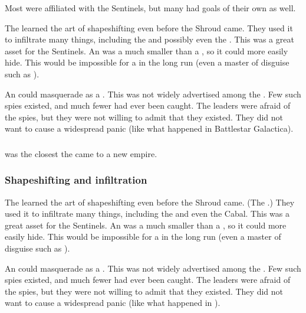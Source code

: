 Most \ophidians were affiliated with the Sentinels, but many had goals of their own as well.

The \ophidians learned the art of shapeshifting even before the Shroud came. 
They used it to infiltrate many things, including the \aryothim and possibly even the \resphain. 
This was a great asset for the Sentinels. 
An \ophidian was a much smaller \vertex than a \dragon, so it could more easily hide.
This would be impossible for a \dragon in the long run (even a master of disguise such as \Nzessuacrith). 

An \ophidian could masquerade as a \bezed. 
This was not widely advertised among the \resphain.
Few such spies existed, and much fewer had ever been caught. 
The \resphan leaders were afraid of the spies, but they were not willing to admit that they existed.
They did not want to cause a widespread panic (like what happened in Battlestar Galactica).





\subsubsection{\Saphyrae}
 was the closest the \ophidians came to a new empire. 





\subsubsection{Shapeshifting and infiltration}
The \ophidians learned the art of shapeshifting even before the Shroud came. 
(The \dragons {}.)
They used it to infiltrate many things, including the \aryothim and even the Cabal. 
This was a great asset for the Sentinels. 
An \ophidian was a much smaller \vertex than a \dragon, so it could more easily hide.
This would be impossible for a \dragon in the long run (even a master of disguise such as \Nzessuacrith). 

An \ophidian could masquerade as a \bezed. 
This was not widely advertised among the \resphain.
Few such spies existed, and much fewer had ever been caught. 
The \resphan leaders were afraid of the spies, but they were not willing to admit that they existed.
They did not want to cause a widespread panic (like what happened in \cite{TV:BattlestarGalactica}).





